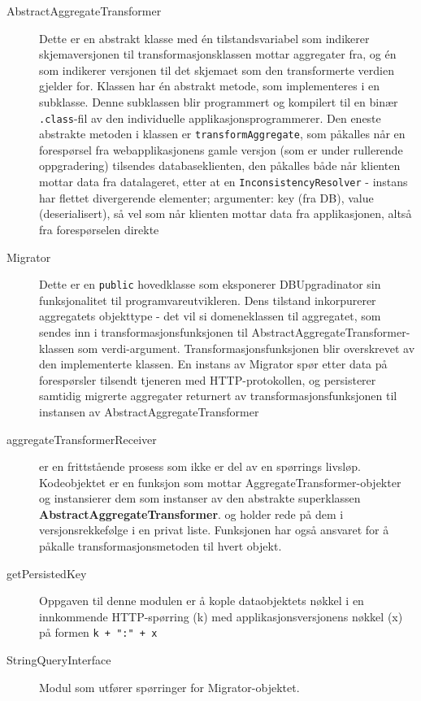 \begin{description}
  \item [AbstractAggregateTransformer] Dette er en abstrakt klasse med én tilstandsvariabel som indikerer skjemaversjonen til transformasjonsklassen mottar aggregater fra, og én som indikerer versjonen til det skjemaet som den transformerte verdien gjelder for. Klassen har én abstrakt metode, som implementeres i en subklasse. Denne subklassen blir programmert og kompilert til en binær \texttt{.class}-fil av den individuelle applikasjonsprogrammerer. Den eneste abstrakte metoden i klassen er \texttt{transformAggregate}, som påkalles når en forespørsel fra webapplikasjonens gamle versjon (som er under rullerende oppgradering) tilsendes databaseklienten, den påkalles både når klienten mottar data fra datalageret, etter at en \texttt{InconsistencyResolver} - instans har flettet divergerende elementer; argumenter: key (fra DB), value (deserialisert), så vel som når klienten mottar data fra applikasjonen, altså fra forespørselen direkte
  \item [Migrator] Dette er en \texttt{public} hovedklasse som eksponerer DBUpgradinator sin funksjonalitet til programvareutvikleren. Dens tilstand inkorpurerer aggregatets objekttype - det vil si domeneklassen til aggregatet, som sendes inn i transformasjonsfunksjonen til AbstractAggregateTransformer-klassen som verdi-argument. Transformasjonsfunksjonen blir overskrevet av den implementerte klassen. En instans av Migrator spør etter data på forespørsler tilsendt tjeneren med HTTP-protokollen, og persisterer samtidig migrerte aggregater returnert av transformasjonsfunksjonen til instansen av AbstractAggregateTransformer
  \item [aggregateTransformerReceiver] er en frittstående prosess som ikke er del av en spørrings livsløp. Kodeobjektet er en funksjon som mottar AggregateTransformer-objekter og instansierer dem som instanser av den abstrakte superklassen \textbf{AbstractAggregateTransformer}. og holder rede på dem i versjonsrekkefølge i en privat liste. Funksjonen har også ansvaret for å påkalle transformasjonsmetoden til hvert objekt.
  \item [getPersistedKey] Oppgaven til denne modulen er å kople dataobjektets nøkkel i en innkommende HTTP-spørring (k) med applikasjonsversjonens nøkkel (x) på formen \texttt{k + ":" + x}
  \item [StringQueryInterface] Modul som utfører spørringer for Migrator-objektet.
\end{description}



